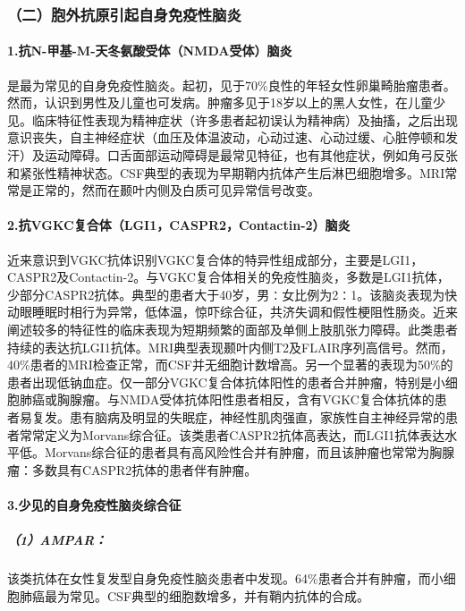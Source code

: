 \subsubsection{（二）胞外抗原引起自身免疫性脑炎}

\paragraph{1.抗N-甲基-M-天冬氨酸受体（NMDA受体）脑炎}

是最为常见的自身免疫性脑炎。起初，见于70\%良性的年轻女性卵巢畸胎瘤患者。然而，认识到男性及儿童也可发病。肿瘤多见于18岁以上的黑人女性，在儿童少见。临床特征性表现为精神症状（许多患者起初误认为精神病）及抽搐，之后出现意识丧失，自主神经症状（血压及体温波动，心动过速、心动过缓、心脏停顿和发汗）及运动障碍。口舌面部运动障碍是最常见特征，也有其他症状，例如角弓反张和紧张性精神状态。CSF典型的表现为早期鞘内抗体产生后淋巴细胞增多。MRI常常是正常的，然而在颞叶内侧及白质可见异常信号改变。

\paragraph{2.抗VGKC复合体（LGI1，CASPR2，Contactin-2）脑炎}

近来意识到VGKC抗体识别VGKC复合体的特异性组成部分，主要是LGI1，CASPR2及Contactin-2。与VGKC复合体相关的免疫性脑炎，多数是LGI1抗体，少部分CASPR2抗体。典型的患者大于40岁，男∶女比例为2∶1。该脑炎表现为快动眼睡眠时相行为异常，低体温，惊吓综合征，共济失调和假性梗阻性肠炎。近来阐述较多的特征性的临床表现为短期频繁的面部及单侧上肢肌张力障碍。此类患者持续的表达抗LGI1抗体。MRI典型表现颞叶内侧T2及FLAIR序列高信号。然而，40\%患者的MRI检查正常，而CSF并无细胞计数增高。另一个显著的表现为50\%的患者出现低钠血症。仅一部分VGKC复合体抗体阳性的患者合并肿瘤，特别是小细胞肺癌或胸腺瘤。与NMDA受体抗体阳性患者相反，含有VGKC复合体抗体的患者易复发。患有脑病及明显的失眠症，神经性肌肉强直，家族性自主神经异常的患者常常定义为Morvans综合征。该类患者CASPR2抗体高表达，而LGI1抗体表达水平低。Morvans综合征的患者具有高风险性合并有肿瘤，而且该肿瘤也常常为胸腺瘤：多数具有CASPR2抗体的患者伴有肿瘤。

\paragraph{3.少见的自身免疫性脑炎综合征}

\subparagraph{（1）AMPAR：}

该类抗体在女性复发型自身免疫性脑炎患者中发现。64\%患者合并有肿瘤，而小细胞肺癌最为常见。CSF典型的细胞数增多，并有鞘内抗体的合成。

